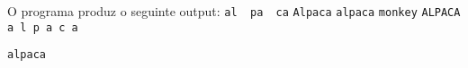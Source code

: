 \documentclass[12pt,varwidth=16cm,border=1pt]{standalone}
\begin{document}
O programa produz o seguinte output:
\newline 
\verb+al  pa  ca+ \newline
\verb+Alpaca+ \newline
\verb+alpaca+ \verb+monkey+ \newline
\verb+ALPACA+ \newline
\verb+a l p a c a + \newline

\verb+alpaca+
\end{document}

